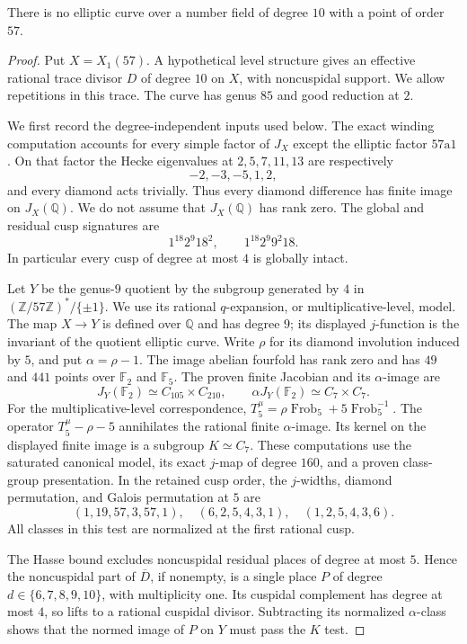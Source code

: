 \begin{proposition}\label{prop:decic57-exclusion}
There is no elliptic curve over a number field of degree $10$
with a point of order $57$.
\end{proposition}
\begin{proof}
Put $X=X_1(57)$. A hypothetical level structure gives an effective
rational trace divisor $D$ of degree $10$ on $X$, with noncuspidal
support. We allow repetitions in this trace. The curve has genus
$85$ and good reduction at $2$.

We first record the degree-independent inputs used below.
The exact winding computation accounts for every simple factor of
$J_X$ except the elliptic factor $57\mathrm a1$. On that factor the
Hecke eigenvalues at $2,5,7,11,13$ are respectively
\[
 -2,-3,-5,1,2,
\]
and every diamond acts trivially. Thus every diamond difference
has finite image on $J_X(\mathbb Q)$. We do not assume that
$J_X(\mathbb Q)$ has rank zero.
The global and residual cusp signatures are
\[
 1^{18}2^9 18^2,\qquad 1^{18}2^9 9^2 18.
\]
In particular every cusp of degree at most $4$ is globally intact.

Let $Y$ be the genus-$9$ quotient by the subgroup generated by
$4$ in $(\mathbb Z/57\mathbb Z)^*/\{\pm1\}$. We use its rational
$q$-expansion, or multiplicative-level, model. The map $X\to Y$
is defined over $\mathbb Q$ and has degree $9$; its displayed
$j$-function is the invariant of the quotient elliptic curve.
Write $\rho$ for its diamond involution induced by $5$, and put
$\alpha=\rho-1$. The image abelian fourfold has rank zero and
has $49$ and $441$ points over $\mathbb F_2$ and $\mathbb F_5$.
The proven finite Jacobian and its $\alpha$-image are
\[
 J_Y(\mathbb F_2)\simeq C_{105}\times C_{210},\qquad
 \alpha J_Y(\mathbb F_2)\simeq C_7\times C_7.
\]
For the multiplicative-level correspondence,
$T_5^\mu=\rho\operatorname{Frob}_5+5\operatorname{Frob}_5^{-1}$.
The operator $T_5^\mu-\rho-5$ annihilates the rational finite
$\alpha$-image. Its kernel on the displayed finite image is a
subgroup $K\simeq C_7$. These computations use the saturated
canonical model, its exact $j$-map of degree $160$, and a proven
class-group presentation. In the retained cusp order, the
$j$-widths, diamond permutation, and Galois permutation at $5$ are
\[
 (1,19,57,3,57,1),\quad (6,2,5,4,3,1),\quad
 (1,2,5,4,3,6).
\]
All classes in this test are normalized at the first rational cusp.

The Hasse bound excludes noncuspidal residual places of degree
at most $5$. Hence the noncuspidal part of $\overline D$, if
nonempty, is a single place $P$ of degree $d\in\{6,7,8,9,10\}$,
with multiplicity one. Its cuspidal complement has degree at
most $4$, so lifts to a rational cuspidal divisor. Subtracting its
normalized $\alpha$-class shows that the normed image of $P$
on $Y$ must pass the $K$ test.


\end{proof}
